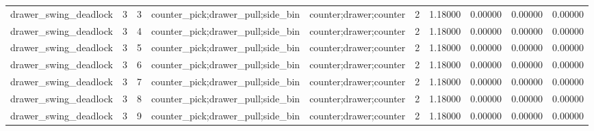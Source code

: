\documentclass{article}
\begin{document}
\begin{table}[tbp]
{\begin{tabular}{llllllllll}
drawer\_swing\_deadlock & 3 & 3 & counter\_pick;drawer\_pull;side\_bin & counter;drawer;counter & 2 & 1.18000 & 0.00000 & 0.00000 & 0.00000 \\
drawer\_swing\_deadlock & 3 & 4 & counter\_pick;drawer\_pull;side\_bin & counter;drawer;counter & 2 & 1.18000 & 0.00000 & 0.00000 & 0.00000 \\
drawer\_swing\_deadlock & 3 & 5 & counter\_pick;drawer\_pull;side\_bin & counter;drawer;counter & 2 & 1.18000 & 0.00000 & 0.00000 & 0.00000 \\
drawer\_swing\_deadlock & 3 & 6 & counter\_pick;drawer\_pull;side\_bin & counter;drawer;counter & 2 & 1.18000 & 0.00000 & 0.00000 & 0.00000 \\
drawer\_swing\_deadlock & 3 & 7 & counter\_pick;drawer\_pull;side\_bin & counter;drawer;counter & 2 & 1.18000 & 0.00000 & 0.00000 & 0.00000 \\
drawer\_swing\_deadlock & 3 & 8 & counter\_pick;drawer\_pull;side\_bin & counter;drawer;counter & 2 & 1.18000 & 0.00000 & 0.00000 & 0.00000 \\
drawer\_swing\_deadlock & 3 & 9 & counter\_pick;drawer\_pull;side\_bin & counter;drawer;counter & 2 & 1.18000 & 0.00000 & 0.00000 & 0.00000 \\
\bottomrule
\end{tabular}
}
\end{table}

\clearpage
\end{document}

